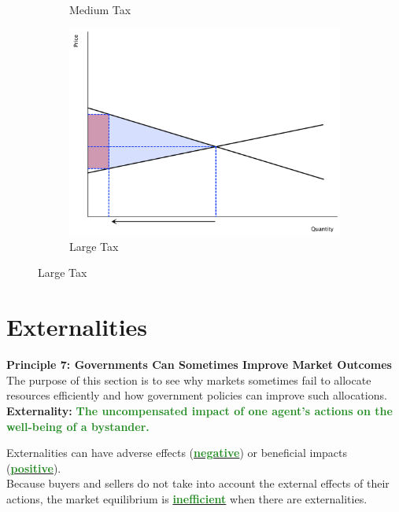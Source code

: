 \documentclass[11pt]{article}\usepackage[]{graphicx}\usepackage[]{color}
\theoremstyle{definition}
\newcommand{\ddp}[1]{{\textbf{\textcolor{ForestGreen}{#1}}}}
\newcommand{\dd}[1]{{\underline{\textbf{\textcolor{ForestGreen}{#1}}}}}
\newcommand{\defn}[1]{\textbf{#1}}
\begin{document}
\begin{figure}[H]
\begin{subfigure}{.3\textwidth}
				\caption{Medium Tax}
			\end{subfigure}
				\begin{subfigure}{.3\textwidth}
					\centering
					\includegraphics[scale=.2]{plot49.pdf}
					\caption{Large Tax}
				\end{subfigure}
		\end{figure}
		
	
	\newpage
	
	\section{Externalities}
	
	\textbf{Principle 7: Governments Can Sometimes Improve Market Outcomes}
	\\
	
	The purpose of this section is to see why markets sometimes fail to allocate resources efficiently and how government policies can improve such allocations.
	\\
	
	\defn{Externality:} \ddp{The uncompensated impact of one agent's actions on the well-being of a bystander.\\}
	
	
	Externalities can have adverse effects (\dd{negative}) or beneficial impacts (\dd{positive}).
	\\
	
	Because buyers and sellers do not take into account the external effects of their actions, the market equilibrium is \dd{inefficient} when there are externalities.
	
\end{document}
